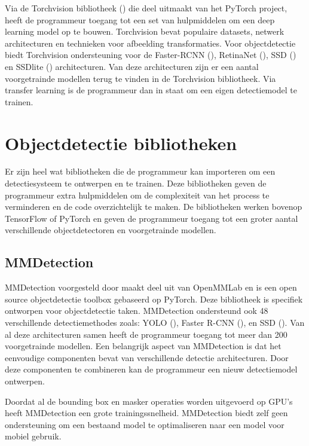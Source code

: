 Via de Torchvision bibliotheek (\cite{Facebook_PyTorch_2017}) die deel uitmaakt van het PyTorch project, heeft de programmeur toegang tot een set van hulpmiddelen om een deep learning model op te bouwen.
Torchvision bevat populaire datasets, netwerk architecturen en technieken voor afbeelding transformaties.
Voor objectdetectie biedt Torchvision ondersteuning voor de Faster-RCNN (\cite{ren_faster_2016}), RetinaNet (\cite{lin_focal_2018}), SSD (\cite{liu_ssd_2016}) en SSDlite (\cite{sandler_mobilenetv2_2019}) architecturen.
Van deze architecturen zijn er een aantal voorgetrainde modellen terug te vinden in de Torchvision bibliotheek.
Via transfer learning is de programmeur dan in staat om een eigen detectiemodel te trainen.

\section{Objectdetectie bibliotheken} \label{lib}
Er zijn heel wat bibliotheken die de programmeur kan importeren om een detectiesysteem te ontwerpen en te trainen.
Deze bibliotheken geven de programmeur extra hulpmiddelen om de complexiteit van het process te verminderen en de code overzichtelijk te maken.
De bibliotheken werken bovenop TensorFlow of PyTorch en geven de programmeur toegang tot een groter aantal verschillende objectdetectoren en voorgetrainde modellen.

\subsection{MMDetection}
MMDetection voorgesteld door \cite{chen_mmdetection_2019} maakt deel uit van OpenMMLab en is een open source objectdetectie toolbox gebaseerd op PyTorch.
Deze bibliotheek is specifiek ontworpen voor objectdetectie taken.
MMDetection ondersteund ook 48 verschillende detectiemethodes zoals: YOLO (\cite{redmon_you_2016}), Faster R-CNN (\cite{ren_faster_2016}), en SSD (\cite{liu_ssd_2016}).
Van al deze architecturen samen heeft de programmeur toegang tot meer dan 200 voorgetrainde modellen.
Een belangrijk aspect van MMDetection is dat het eenvoudige componenten bevat van verschillende detectie architecturen.
Door deze componenten te combineren kan de programmeur een nieuw detectiemodel ontwerpen.

Doordat al de bounding box en masker operaties worden uitgevoerd op GPU's heeft MMDetection een grote trainingssnelheid.
MMDetection biedt zelf geen ondersteuning om een bestaand model te optimaliseren naar een model voor mobiel gebruik.

